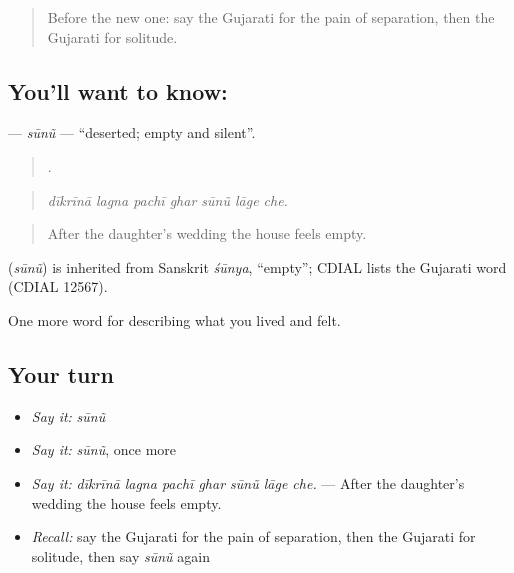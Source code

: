 \label{lesson:GU-C458-sunu}



\begin{quote}
Before the new one: say the Gujarati for the pain of separation, then the Gujarati for solitude.
\end{quote}

\subsection*{You'll want to know: }
\textbf{} — \emph{sūnũ} — \textquotedblleft{}deserted; empty and silent\textquotedblright{}.

\begin{quote}
      .
\end{quote}

\begin{quote}
\emph{dīkrīnā lagna pachī ghar sūnũ lāge che.}
\end{quote}

\begin{quote}
After the daughter's wedding the house feels empty.
\end{quote}

\begin{cousinweb}
\textbf{} (\emph{sūnũ}) is inherited from Sanskrit \emph{śūnya}, \textquotedblleft{}empty\textquotedblright{}; CDIAL lists the Gujarati word (CDIAL 12567).
\end{cousinweb}

\begin{grammarlens}[title={What you've built}]
One more word for describing what you lived and felt.
\end{grammarlens}

\subsection*{Your turn}
\begin{itemize}
\raggedright
  \item \emph{Say it:} \emph{sūnũ}
  \item \emph{Say it:} \emph{sūnũ}, once more
  \item \emph{Say it:} \emph{dīkrīnā lagna pachī ghar sūnũ lāge che.} — After the daughter's wedding the house feels empty.
  \item \emph{Recall:} say the Gujarati for the pain of separation, then the Gujarati for solitude, then say \emph{sūnũ} again
\end{itemize}

